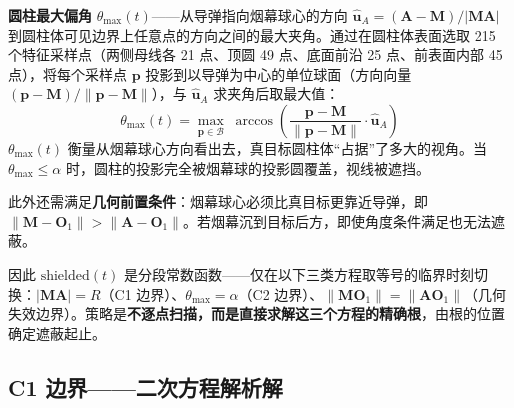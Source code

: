 \documentclass[12pt,a4paper]{ctexart}
\newcommand{\MA}{|\mathbf{M}\mathbf{A}|}
\begin{document}
\textbf{圆柱最大偏角} $\theta_{\max}(t)$——从导弹指向烟幕球心的方向 $\hat{\mathbf{u}}_A = (\mathbf{A} - \mathbf{M})/\MA$ 到圆柱体可见边界上任意点的方向之间的最大夹角。通过在圆柱体表面选取 215 个特征采样点（两侧母线各 21 点、顶圆 49 点、底面前沿 25 点、前表面内部 45 点），将每个采样点 $\mathbf{p}$ 投影到以导弹为中心的单位球面（方向向量 $(\mathbf{p} - \mathbf{M})/\|\mathbf{p} - \mathbf{M}\|$），与 $\hat{\mathbf{u}}_A$ 求夹角后取最大值：
\begin{equation}
\boxed{\theta_{\max}(t) = \max_{\mathbf{p} \in \mathcal{B}}\; \arccos\!\left(\frac{\mathbf{p} - \mathbf{M}}{\|\mathbf{p} - \mathbf{M}\|} \cdot \hat{\mathbf{u}}_A\right)}
\end{equation}
$\theta_{\max}(t)$ 衡量从烟幕球心方向看出去，真目标圆柱体``占据''了多大的视角。当 $\theta_{\max} \leq \alpha$ 时，圆柱的投影完全被烟幕球的投影圆覆盖，视线被遮挡。

此外还需满足\textbf{几何前置条件}：烟幕球心必须比真目标更靠近导弹，即 $\|\mathbf{M} - \mathbf{O}_1\| > \|\mathbf{A} - \mathbf{O}_1\|$。若烟幕沉到目标后方，即使角度条件满足也无法遮蔽。

因此 $\text{shielded}(t)$ 是分段常数函数——仅在以下三类方程取等号的临界时刻切换：$\MA = R$（C1 边界）、$\theta_{\max} = \alpha$（C2 边界）、$\|\mathbf{M}\mathbf{O}_1\| = \|\mathbf{A}\mathbf{O}_1\|$（几何失效边界）。策略是\textbf{不逐点扫描，而是直接求解这三个方程的精确根}，由根的位置确定遮蔽起止。

\subsection{C1 边界——二次方程解析解}
\end{document}
